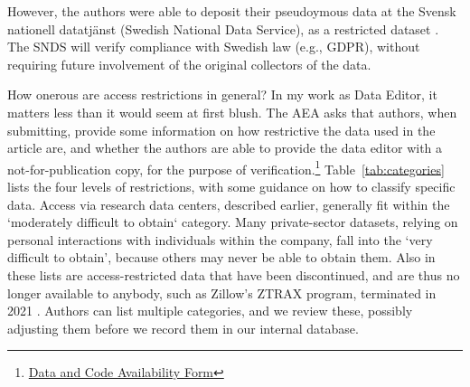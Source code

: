 \documentclass{Revue-economique}
\newcommand{\citep}{\parencite}
\begin{document}
\begin{Article} [%
	Titre={Reproducibility and Open Science in Economics},
	Auteur={Lars Vilhuber\thanks{Cornell University, lars.vilhuber@cornell.edu}}]
\begin{refsection}[Main]
%
%
However, the authors were able to deposit their pseudoymous data at the Svensk nationell datatjänst (Swedish National Data Service), as a restricted dataset \citep{ahrsjo_data_2023}. The SNDS will verify compliance with Swedish law (e.g., \ac{GDPR}), without requiring future involvement of the original collectors of the data. 

How onerous are access restrictions in general? In my work as Data Editor, it matters less than it would seem at first blush. The AEA asks that authors, when submitting, provide some information on how restrictive the data used in the article are, and whether the authors are able to provide the data editor with a not-for-publication copy, for the purpose of verification.\footnote{\href{https://www.aeaweb.org/journals/forms/data-code-availability}{Data and Code Availability Form}} Table~\ref{tab:categories} lists the four levels of restrictions, with some guidance on how to classify specific data. Access via research data centers, described earlier, generally fit within the `moderately difficult to obtain` category. Many private-sector datasets, relying on personal interactions with individuals within the company, fall into the `very difficult to obtain', because others may never be able to obtain them. Also in these lists are access-restricted data that have been discontinued, and are thus no longer available to anybody, such as Zillow's  ZTRAX program, terminated in 2021 \citep{zillow_zillows_2021}. Authors can list multiple categories, and we review these, possibly adjusting them before we record them in our internal database. 


\end{refsection}
\end{Article}
\end{document}
